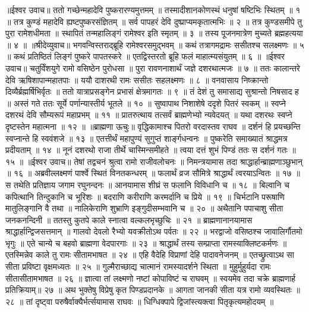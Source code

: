॥ईश्वर उवाच॥
ततो गच्छेन्महादेवि पुष्करारण्यमुत्तमम् ॥
तस्मादीशानकोणस्थं धनुषां षष्टिभिः स्थितम् ॥ १ ॥
तत्र कुण्डं महादेवि ह्यष्टपुष्करसंज्ञितम् ॥
सर्व पापहरं देवि दुष्प्राप्यमकृतात्मभिः ॥ २ ॥
तत्र कुण्डसमीपे तु पुरा रामेशधीमता ॥
स्थापितं तन्महालिङ्गं रामेश्वर इति स्मृतम् ॥ ३ ॥
तस्य पूजनमात्रेण मुच्यते ब्रह्महत्यया ॥ ४ ॥
॥श्रीदेव्युवाच॥
भगवन्विस्तराद्ब्रूहि रामेश्वरसमुद्भवम् ॥
कथं तत्रागमद्रामः ससीतश्च सलक्ष्मणः ॥ ५ ॥
कथं प्रतिष्ठितं लिङ्गं पुष्करे पापतस्करे ॥
एतद्विस्तरतो ब्रूहि फलं माहात्म्यसंयुतम् ॥ ६ ॥
॥ईश्वर उवाच॥
चतुर्विंशयुगे रामो वसिष्ठेन पुरोधसा ॥
पुरा रावणनाशार्थं जज्ञे दशरथात्मजः ॥ ७ ॥
ततः कालान्तरे देवि ऋषिशापान्महातपाः ॥
ययौ दाशरथी रामः ससीतः सहलक्ष्मणः ॥ ८ ॥
वनवासाय निष्क्रान्तो दिव्यैर्ब्रह्मर्षिभिर्वृतः ॥
ततो यात्राप्रसङ्गेन प्रभासं क्षेत्रमागतः ॥ ९ ॥
तं देशं तु समासाद्य सुश्रान्तो निषसाद ह ॥
अस्तं गते ततः सूर्ये पर्णान्यास्तीर्य भूतले ॥ १० ॥
सुष्वापाथ निशाशेषे ददृशे पितरं स्वकम् ॥
स्वप्ने दशरथं देवि सौम्यरूपं महाप्रभम् ॥ ११ ॥
प्रातरुत्थाय तत्सर्वं ब्राह्मणेभ्यो न्यवेदयत् ॥
यथा दशरथः स्वप्ने दृष्टस्तेन महात्मना ॥ १२ ॥
॥ब्राह्मणा ऊचुः॥
वृद्धिकामाश्च पितरो वरदास्तव राघव ॥
दर्शनं हि प्रयच्छन्ति स्वप्नान्ते हि स्ववंशजे ॥ १३ ॥
एतत्तीर्थं महापुण्यं सुगुप्तं शार्ङ्गधन्वनः ॥
पुष्करेति समाख्यातं श्राद्धमत्र प्रदीयताम् ॥ १४ ॥
नूनं दशरथो राजा तीर्थे चास्मिन्समीहते ॥
त्वया दत्तं शुभं पिण्डं ततः स दर्शनं गतः ॥ १५ ॥
॥ईश्वर उवाच॥
तेषां तद्वचनं श्रुत्वा रामो राजीवलोचनः ॥
निमन्त्रयामास तदा श्राद्धार्हान्ब्राह्मणाञ्छुभान् ॥ १६ ॥
अब्रवील्लक्ष्मणं पार्श्वे स्थितं विनतकन्धरम् ॥
फलार्थं व्रज सौमित्रे श्राद्धार्थं त्वरयाऽन्वितः ॥ १७ ॥
स तथेति प्रतिज्ञाय जगाम रघुनन्दनः ॥
आनयामास शीघ्रं स फलानि विविधानि च ॥ १८ ॥
बिल्वानि च कपित्थानि तिन्दुकानि च भूरिशः ॥
बदराणि करीराणि करमर्दानि च प्रिये ॥ १९ ॥
चिर्भटानि परूषाणि मातुलिङ्गानि वै तथा ॥
नालिकेराणि शुभ्राणि इङ्गुदीसम्भवानि च ॥ २० ॥
अथैतानि पपाचाशु सीता जनकनन्दिनी ॥
ततस्तु कुतपे काले स्नात्वा वल्कलभृच्छुचिः ॥ २१ ॥
ब्राह्मणानानयामास श्राद्धार्हान्द्विजसत्तमान् ॥
गालवो देवलो रैभ्यो यवक्रीतोऽथ पर्वतः ॥ २२ ॥
भरद्वाजो वसिष्ठश्च जावालिर्गौतमो भृगुः ॥
एते चान्ये च बहवो ब्राह्मणा वेदपारगाः ॥ २३ ॥
श्राद्धार्थं तस्य सम्प्राप्ता रामस्याक्लिष्टकर्मणः ॥
एतस्मिन्नेव काले तु रामः सीतामभाषत ॥ २४ ॥
एहि वैदेहि विप्राणां देहि पादावनेजनम् ॥
एतच्छ्रुत्वाऽथ सा सीता प्रविष्टा वृक्षमध्यतः ॥ २५ ॥
गुल्मैराच्छाद्य चात्मानं रामस्यादर्शने स्थिता ॥
मुहुर्मुहुर्यदा रामः सीतासीतामभाषत ॥ २६ ॥
ज्ञात्वा तां लक्ष्मणो नष्टां कोपाविष्टं च राघवम् ॥
स्वयमेव तदा चक्रे ब्राह्मणार्ह प्रतिक्रियाम्॥ २७ ॥
अथ भुक्तेषु विप्रेषु कृत पिण्डप्रदानके ॥
आगता जानकी सीता यत्र रामो व्यवस्थितः ॥ २८ ॥
तां दृष्ट्वा परुषैर्वाक्यैर्भर्त्सयामास राघवः ॥
धिग्धिक्पापे द्विजांस्त्यक्त्वा पितृकृत्यमहोदयम् ॥
